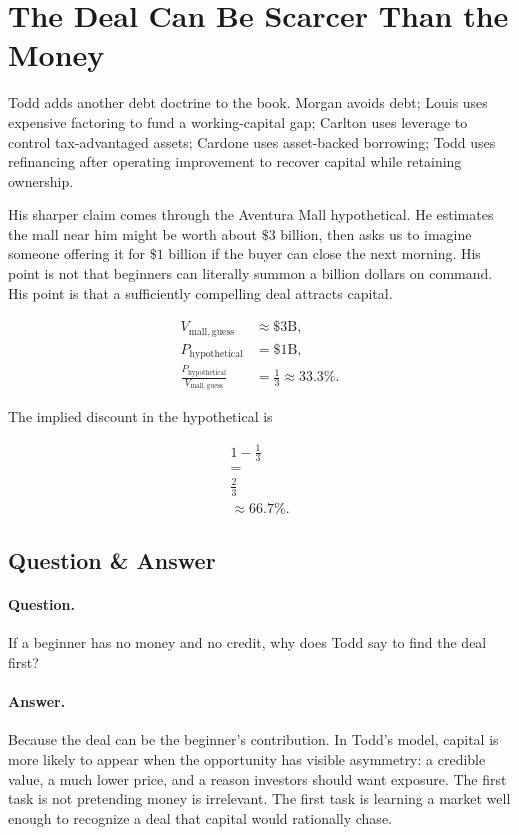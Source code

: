 \documentclass[11pt,oneside]{book}
\begin{document}
\section{The Deal Can Be Scarcer Than the Money}

Todd adds another debt doctrine to the book. Morgan avoids debt; Louis uses expensive factoring to fund a working-capital gap; Carlton uses leverage to control tax-advantaged assets; Cardone uses asset-backed borrowing; Todd uses refinancing after operating improvement to recover capital while retaining ownership.

His sharper claim comes through the Aventura Mall hypothetical. He estimates the mall near him might be worth about \(\$3\) billion, then asks us to imagine someone offering it for \(\$1\) billion if the buyer can close the next morning. His point is not that beginners can literally summon a billion dollars on command. His point is that a sufficiently compelling deal attracts capital.

\begin{align}
V_{\mathrm{mall,guess}} &\approx \$3\mathrm{B},\\
P_{\mathrm{hypothetical}} &= \$1\mathrm{B},\\
\frac{P_{\mathrm{hypothetical}}}{V_{\mathrm{mall,guess}}}
&=
\frac{1}{3}
\approx 33.3\%.
\end{align}

The implied discount in the hypothetical is

\begin{equation}
\begin{gathered}
1-\frac{1}{3}\\
=\\
\frac{2}{3}\\
\approx 66.7\%.
\end{gathered}
\end{equation}

\subsection{Question \& Answer}

\paragraph{Question.}
If a beginner has no money and no credit, why does Todd say to find the deal first?

\paragraph{Answer.}
Because the deal can be the beginner's contribution. In Todd's model, capital is more likely to appear when the opportunity has visible asymmetry: a credible value, a much lower price, and a reason investors should want exposure. The first task is not pretending money is irrelevant. The first task is learning a market well enough to recognize a deal that capital would rationally chase.
\end{document}
